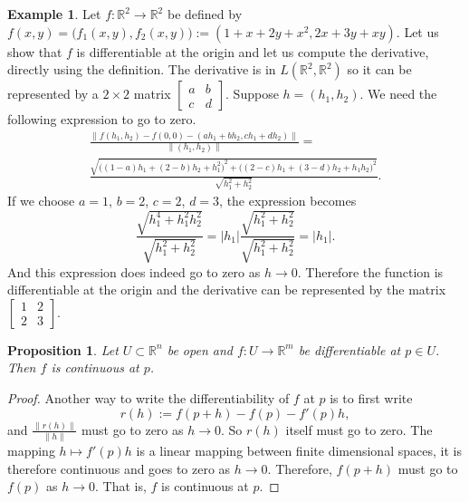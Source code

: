 \documentclass[12pt]{book}
\newcommand{\snorm}[1]{\lVert {#1} \rVert}
\newcommand{\abs}[1]{\left\lvert {#1} \right\rvert}
\newcommand{\R}{{\mathbb{R}}}
\theoremstyle{plain}
\newtheorem{prop}[thm]{Proposition}
\theoremstyle{remark}
\theoremstyle{definition}
\theoremstyle{exercise}
\theoremstyle{example}
\newtheorem{example}[thm]{Example}
\begin{document}
\begin{example}
Let $f \colon \R^2 \to \R^2$ be defined by
$f(x,y) = \bigl(f_1(x,y),f_2(x,y)\bigr) := (1+x+2y+x^2,2x+3y+xy)$.
Let us show that $f$ is differentiable at the origin and let us 
compute the derivative,
directly using the definition.  The derivative is in $L(\R^2,\R^2)$ so it can be
represented by a $2\times 2$ matrix
$\left[\begin{smallmatrix}a&b\\c&d\end{smallmatrix}\right]$.  Suppose $h =
(h_1,h_2)$.  We need the following expression to go to zero.
\begin{multline*}
\frac{\snorm{
f(h_1,h_2)-f(0,0)
-
(ah_1 +bh_2 , ch_1+dh_2)}
}{\snorm{(h_1,h_2)}}
=
\\
\frac{\sqrt{
{\bigl((1-a)h_1 + (2-b)h_2 + h_1^2\bigr)}^2
+
{\bigl((2-c)h_1 + (3-d)h_2 + h_1h_2\bigr)}^2}}{\sqrt{h_1^2+h_2^2}} .
\end{multline*}
If we choose $a=1$, $b=2$, $c=2$, $d=3$, the expression becomes
\begin{equation*}
\frac{\sqrt{
h_1^4 + h_1^2h_2^2}}{\sqrt{h_1^2+h_2^2}}
=
\abs{h_1}
\frac{\sqrt{
h_1^2 + h_2^2}}{\sqrt{h_1^2+h_2^2}}
= \abs{h_1} .
\end{equation*}
And this expression does indeed go to zero as $h \to 0$.  Therefore the
function is differentiable at the origin and 
the derivative can be represented by the matrix
$\left[\begin{smallmatrix}1&2\\2&3\end{smallmatrix}\right]$.
\end{example}

\begin{prop}
Let $U \subset \R^n$ be open and $f \colon U \to \R^m$ be
differentiable at $p \in U$.  Then $f$ is continuous at $p$.
\end{prop}

\begin{proof}
Another way to write the differentiability of $f$ at $p$ is to first write
\begin{equation*}
r(h) := f(p+h)-f(p) - f'(p) h ,
\end{equation*}
and $\frac{\snorm{r(h)}}{\snorm{h}}$ must go to zero as $h \to 0$.
So
$r(h)$ itself must go to zero.  The mapping $h \mapsto f'(p) h$
is a linear mapping between finite dimensional spaces, it is
therefore continuous
and goes to zero as $h \to 0$.  Therefore,
$f(p+h)$ must go to $f(p)$ as $h \to 0$.  That is, $f$ is continuous at $p$.
\end{proof}
\end{document}
